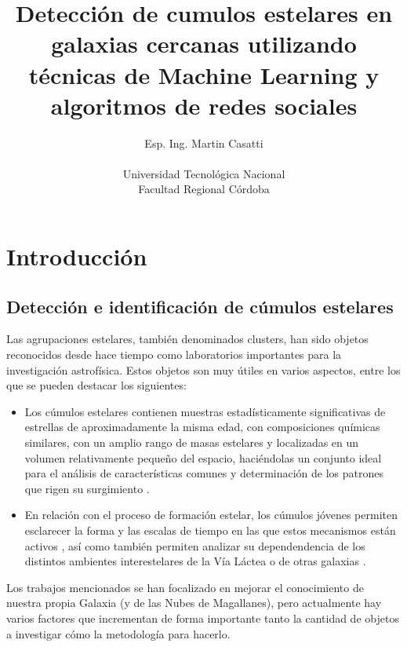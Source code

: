 \documentclass[
	11pt,oneside,a4paper,
	headsepline,footsepline,
	fleqn,
]{memoir}
\title{Detección de cumulos estelares en galaxias cercanas utilizando técnicas de Machine Learning y algoritmos de redes sociales}
\author{Esp. Ing. Martin Casatti\\
\\Universidad Tecnológica Nacional\\
Facultad Regional Córdoba}
\begin{document}
\maketitle
{}


\newpage

\tableofcontents

\listoftodos

\newpage

\section {Introducción}

\subsection{Detección e identificación de cúmulos estelares}

Las agrupaciones estelares, también denominados clusters, han sido objetos reconocidos desde hace tiempo como laboratorios importantes para la investigación astrofísica. Estos objetos son muy útiles en varios aspectos, entre los que se pueden destacar los siguientes:

\begin{itemize}
	\item Los cúmulos estelares contienen muestras estadísticamente significativas de estrellas de aproximadamente la misma edad, con composiciones químicas similares, con un amplio rango de masas estelares y localizadas en un volumen relativamente pequeño del espacio, haciéndolas un conjunto ideal para el análisis de características comunes y determinación de los patrones que rigen su surgimiento \cite{Klessen2000}.
	\item En relación con el proceso de formación estelar, los cúmulos jóvenes permiten esclarecer la forma y las escalas de tiempo en las que estos mecanismos están activos \cite{Sung1998}, así como también permiten analizar su dependendencia de los distintos ambientes interestelares de la Vía Láctea o de otras galaxias \cite{Fall2012}.	
\end{itemize}

Los trabajos mencionados se han focalizado en mejorar el conocimiento de nuestra propia Galaxia (y de las Nubes de Magallanes\cite{Vazquez2008}), pero actualmente hay varios factores que incrementan de forma importante tanto la cantidad de objetos a investigar cómo la metodología para hacerlo.
\end{document}
